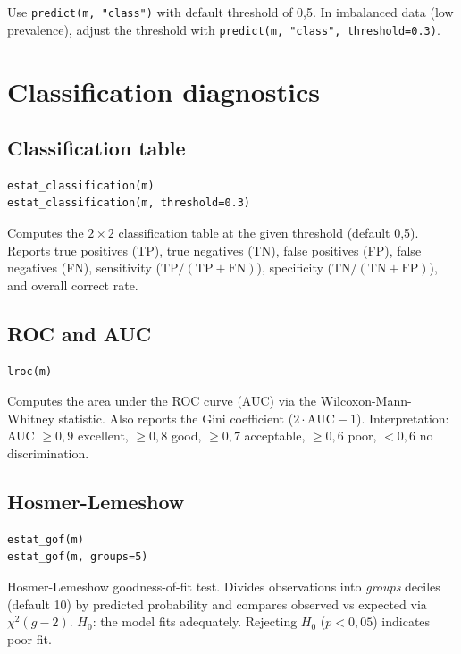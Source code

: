\begin{nota}
  Use \lstinline{predict(m, "class")} with default threshold of 0{,}5.
  In imbalanced data (low prevalence), adjust the threshold with
  \lstinline{predict(m, "class", threshold=0.3)}.
\end{nota}

\section{Classification diagnostics}

\subsection{Classification table}

\begin{lstlisting}
estat_classification(m)
estat_classification(m, threshold=0.3)
\end{lstlisting}

Computes the $2\times2$ classification table at the given threshold
(default 0{,}5). Reports true positives (TP), true negatives (TN),
false positives (FP), false negatives (FN), sensitivity
($\mathrm{TP}/(\mathrm{TP}+\mathrm{FN})$), specificity
($\mathrm{TN}/(\mathrm{TN}+\mathrm{FP})$), and overall correct rate.

\subsection{ROC and AUC}

\begin{lstlisting}
lroc(m)
\end{lstlisting}

Computes the area under the ROC curve (AUC) via the
Wilcoxon-Mann-Whitney statistic. Also reports the Gini coefficient
($2\cdot\mathrm{AUC}-1$). Interpretation: AUC $\geq 0{,}9$ excellent,
$\geq 0{,}8$ good, $\geq 0{,}7$ acceptable, $\geq 0{,}6$ poor,
$< 0{,}6$ no discrimination.

\subsection{Hosmer-Lemeshow}

\begin{lstlisting}
estat_gof(m)
estat_gof(m, groups=5)
\end{lstlisting}

Hosmer-Lemeshow goodness-of-fit test. Divides observations into
\textit{groups} deciles (default 10) by predicted probability and
compares observed vs expected via $\chi^2(g-2)$. $H_0$: the model fits
adequately. Rejecting $H_0$ ($p < 0{,}05$) indicates poor fit.
